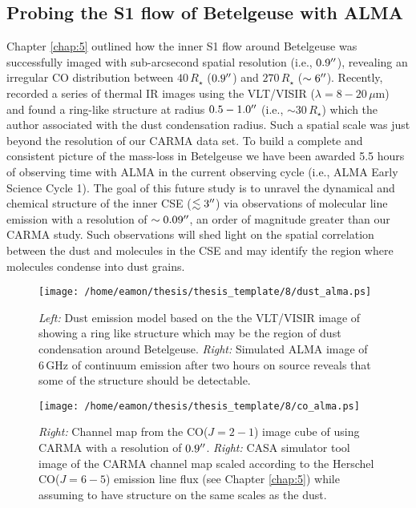 \subsection{Probing the S1 flow of Betelgeuse with ALMA}\label{sec:8.2.1}
Chapter \ref{chap:5} outlined how the inner S1 flow around Betelgeuse was successfully imaged with sub-arcsecond spatial resolution (i.e., $0.9^{\prime\prime}$), revealing an irregular CO distribution between $40\,R_{\star}$ ($0.9^{\prime\prime}$) and $270\,R_{\star}$ ($\sim 6^{\prime\prime}$). Recently, \cite{kervella_2011} recorded a series of thermal IR images using the VLT/VISIR ($\lambda = 8-20\,\mu$m) and found a ring-like structure at radius $0.5-1.0^{\prime\prime}$ (i.e., $\sim 30\,R_{\star}$) which the author associated with the dust condensation radius. Such a spatial scale was just beyond the resolution of our CARMA data set. To build a complete and consistent picture of the mass-loss in Betelgeuse we have been awarded 5.5 hours of observing time with ALMA in the current observing cycle (i.e., ALMA Early Science Cycle 1). The goal of this future study is to unravel the dynamical and chemical structure of the inner CSE ($\lesssim 3^{\prime\prime}$) via observations of molecular line emission with a resolution of $\sim 0.09^{\prime\prime}$, an order of magnitude greater than our CARMA study. Such observations will shed light on the spatial correlation between the dust and molecules in the CSE and may identify the region where molecules condense into dust grains.

\begin{figure}[!ht]
\centering 
        \texttt{[image: /home/eamon/thesis/thesis\_template/8/dust\_alma.ps]}
\caption[Simulating ALMA dust observations.]{\textit{Left:} Dust emission model based on the the VLT/VISIR image of \cite{kervella_2011} showing a ring like structure which may be the region of dust condensation around Betelgeuse. \textit{Right:} Simulated ALMA image of 6\,GHz of continuum emission after two hours on source reveals that some of the structure should be detectable. }
\label{fig:8.1}
\end{figure}

\begin{figure}[!ht]
\centering 
        \texttt{[image: /home/eamon/thesis/thesis\_template/8/co\_alma.ps]}
\caption[Simulating ALMA CO(J=6-5) observations.]{\textit{Right:} Channel map from the CO($J=2-1$) image cube of \cite{ogorman_2012} using CARMA with a resolution of $0.9^{\prime\prime}$. \textit{Right:} CASA simulator tool image of the CARMA channel map scaled according to the Herschel CO($J=6-5$) emission line flux (see Chapter \ref{chap:5}) while assuming to have structure on the same scales as the dust.} 
\label{fig:8.2}
\end{figure}

